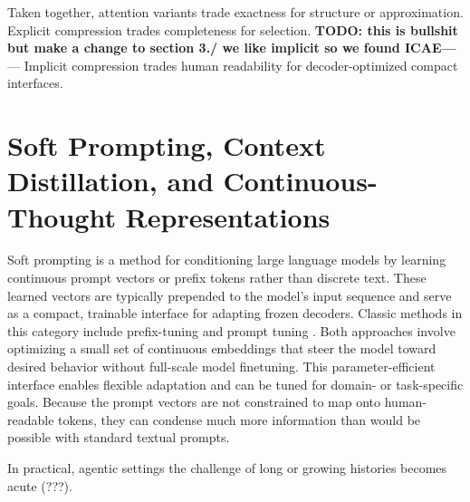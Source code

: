 Taken together, attention variants trade exactness for structure or approximation.
Explicit compression trades completeness for selection.
\textbf{TODO: this is bullshit but make a change to section 3./ we like implicit so we found ICAE---} --- Implicit compression trades human readability for decoder-optimized compact interfaces.



\section{Soft Prompting, Context Distillation, and Continuous-Thought Representations}

Soft prompting is a method for conditioning large language models by learning continuous prompt vectors or prefix tokens rather than discrete text. 
These learned vectors are typically prepended to the model's input sequence and serve as a compact, trainable interface for adapting frozen decoders.
Classic methods in this category include prefix-tuning \cite{li_prefix_2021} and prompt tuning \cite{lester_prompt_2021}.
Both approaches involve optimizing a small set of continuous embeddings that steer the model toward desired behavior without full-scale model finetuning.
This parameter-efficient interface enables flexible adaptation and can be tuned for domain- or task-specific goals.
Because the prompt vectors are not constrained to map onto human-readable tokens, they can condense much more information than would be possible with standard textual prompts.

In practical, agentic settings the challenge of long or growing histories becomes acute (???).

